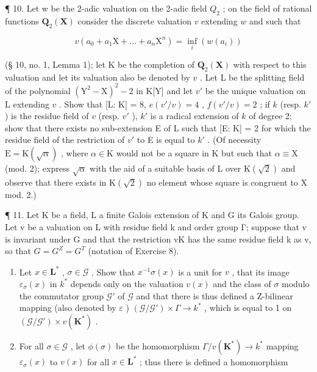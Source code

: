 ¶ 10. Let w be the 2-adic valuation on the 2-adic field \(Q_{2}\) ; on the field of rational functions \(\mathbf{Q}_2(\mathbf{X})\) consider the discrete valuation \(v\) extending \(w\) and such that

\[
v (a _ {0} + a _ {1} \mathrm{X} + \dots + a _ {n} \mathrm{X} ^ {n}) = \inf _ {i} (w (a _ {i}))
\]

(§ 10, no. 1, Lemma 1); let K be the completion of \(\mathbf{Q}_2(\mathbf{X})\) with respect to this valuation and let its valuation also be denoted by \(v\) . Let L be the splitting field of the polynomial \((\mathrm{Y}^2 - \mathrm{X})^2 - 2\) in K{[}Y{]} and let \(v'\) be the unique valuation on L extending \(v\) . Show that {[}L: K{]} = 8, \(e(v'/v) = 4\) , \(f(v'/v) = 2\) ; if \(k\) (resp. \(k'\) ) is the residue field of \(v\) (resp. \(v'\) ), \(k'\) is a radical extension of \(k\) of degree 2; show that there exists no sub-extension E of L such that {[}E: K{]} = 2 for which the residue field of the restriction of \(v'\) to E is equal to \(k'\) . (Of necessity \(\mathrm{E} = \mathrm{K}(\sqrt{\alpha})\) , where \(\alpha \in \mathrm{K}\) would not be a square in K but such that \(\alpha \equiv \mathrm{X}\) (mod. 2); express \(\sqrt{\alpha}\) with the aid of a suitable basis of L over \(\mathrm{K}(\sqrt{2})\) and observe that there exists in \(\mathrm{K}(\sqrt{2})\) no element whose square is congruent to X mod. 2.)

¶ 11. Let K be a field, L a finite Galois extension of K and G its Galois group. Let v be a valuation on L with residue field k and order group Γ; suppose that v is invariant under G and that the restriction v\textbar K has the same residue field k as v, so that \(G = G^{Z} = G^{T}\) (notation of Exercise 8).

\begin{enumerate}
\def\labelenumi{(\alph{enumi})}
\item
  Let \(x \in \mathbf{L}^*\) , \(\sigma \in \mathcal{G}\) . Show that \(x^{-1}\sigma(x)\) is a unit for \(v\) , that its image \(\varepsilon_{\sigma}(x)\) in \(k^*\) depends only on the valuation \(v(x)\) and the class of \(\sigma\) modulo the commutator group \(\mathcal{G}'\) of \(\mathcal{G}\) and that there is thus defined a Z-bilinear mapping (also denoted by \(\varepsilon\) ) \((\mathcal{G}/\mathcal{G}') \times \Gamma \to k^*\) , which is equal to 1 on \((\mathcal{G}/\mathcal{G}') \times v(\mathbf{K}^*)\) .
\item
  For all \(\sigma \in \mathcal{G}\) , let \(\phi(\sigma)\) be the homomorphism \(\Gamma / v(\mathbf{K}^*) \to k^*\) mapping \(\varepsilon_{\sigma}(x)\) to \(v(x)\) for all \(x \in \mathbf{L}^*\) ; thus there is defined a homomorphism
\end{enumerate}

